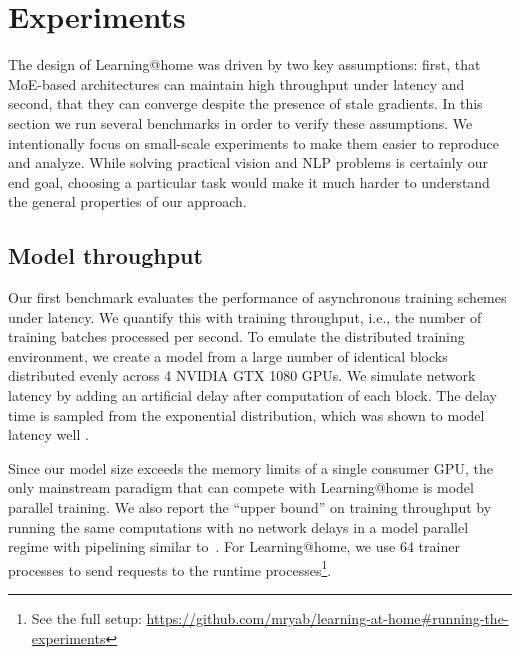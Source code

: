 \vspace{-6px}
\section{Experiments}\label{sect:experiments}
\vspace{-4px}

The design of Learning@home was driven by two key assumptions: first, that MoE-based architectures can maintain high throughput under latency and second, that they can converge despite the presence of stale gradients. In this section we run several benchmarks in order to verify these assumptions. We intentionally focus on small-scale experiments to make them easier to reproduce and analyze. While solving practical vision and NLP problems is certainly our end goal, choosing a particular task would make it much harder to understand the general properties of our approach.

\vspace{-6px}
\subsection{Model throughput}\label{sect:exp_throughput}
\vspace{-4px}

Our first benchmark evaluates the performance of asynchronous training schemes under latency. We quantify this with training throughput, i.e., the number of training batches processed per second.
To emulate the distributed training environment, we create a model from a large number of identical blocks distributed evenly across 4 NVIDIA GTX 1080 GPUs. 
We simulate network latency by adding an artificial delay after computation of each block. The delay time is sampled from the exponential distribution, which was shown to model latency well \cite{sukhov2016generating}.%

\vspace{-1px}

Since our model size exceeds the memory limits of a single consumer GPU, the only mainstream paradigm that can compete with Learning@home is model parallel training. We also report the ``upper bound'' on training throughput by running the same computations with no network delays in a model parallel regime with pipelining similar to~\cite{huang2019gpipe}. For Learning@home, we use 64 trainer processes to send requests to the runtime processes\footnote{See the full setup: \url{https://github.com/mryab/learning-at-home\#running-the-experiments}}.

